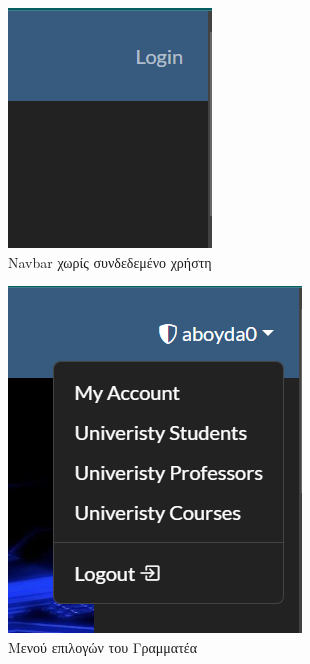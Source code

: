 \documentclass[12pt]{article}
\begin{document}
	\begin{figure}[H]
		\centering
		\begin{subfigure}{.35\textwidth}
			\centering
			\includegraphics[width=.75\linewidth]{b0.png}
			\caption{Navbar χωρίς συνδεδεμένο χρήστη}
			\label{fig:sub21}
		\end{subfigure}%
		\begin{subfigure}{.35\textwidth}
			\centering
			\includegraphics[width=.8\linewidth]{b1.png}
			\caption{Μενού επιλογών του Γραμματέα}
			\label{fig:sub22}
		\end{subfigure}
		\caption{}
		\label{fig:test1}
	\end{figure}
\end{document}
